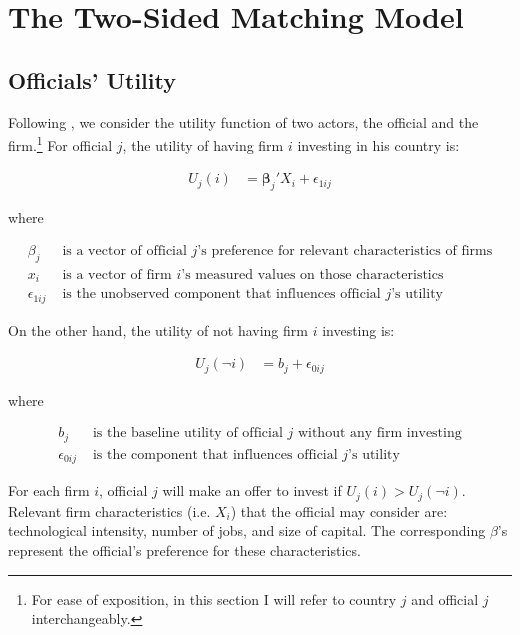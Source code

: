 \section{The Two-Sided Matching Model}
\label{sec:model}

\subsection{Officials' Utility}

Following \citet{Logan1998}, we consider the utility function of two actors, the official and the firm.\footnote{For ease of exposition, in this section I will refer to country $j$ and official $j$ interchangeably.} For official $j$, the utility of having firm $i$ investing in his country is:

\begin{align}
U_j(i) &= \bm{\beta}_j' X_i + \epsilon_{1ij}
\end{align}

where

\begin{align*}
\beta_j &\text{ is a vector of official $j$'s preference for relevant characteristics of firms} \\
x_i &\text{ is a vector of firm $i$'s measured values on those characteristics} \\
\epsilon_{1ij} &\text{ is the unobserved component that influences official $j$'s utility}
\end{align*}

On the other hand, the utility of not having firm $i$ investing is:

\begin{align}
U_j(\neg i) &= b_j + \epsilon_{0ij}
\end{align}

where

\begin{align*}
b_j &\text{ is the baseline utility of official $j$ without any firm investing} \\
\epsilon_{0ij} &\text{ is the component that influences official $j$'s utility}
\end{align*}

For each firm $i$, official $j$ will make an offer to invest if $U_j(i) > U_j(\neg i)$. Relevant firm characteristics (i.e. $X_i$) that the official may consider are: technological intensity, number of jobs, and size of capital. The corresponding $\beta$'s represent the official's preference for these characteristics.

